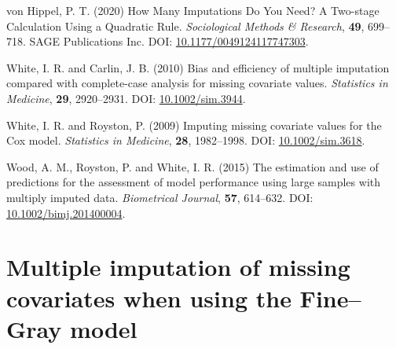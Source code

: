 \documentclass[
  letterpaper,
  DIV=11,
  numbers=noendperiod]{scrreprt}
\newlength{\cslhangindent}
\newlength{\cslentryspacingunit} %
\newenvironment{CSLReferences}[2] %
 {%
  \setlength{\parindent}{0pt}
  \ifodd #1
  \let\oldpar\par
  \def\par{\hangindent=\cslhangindent\oldpar}
  \fi
  \setlength{\parskip}{#2\cslentryspacingunit}
 }%
 {}
\begin{document}
\begin{CSLReferences}{1}{0}
\leavevmode{}%
von Hippel, P. T. (2020) How {Many Imputations Do You Need}? {A
Two-stage Calculation Using} a {Quadratic Rule}. \emph{Sociological
Methods \& Research}, \textbf{49}, 699--718. SAGE Publications Inc. DOI:
\href{https://doi.org/10.1177/0049124117747303}{10.1177/0049124117747303}.

\leavevmode{}%
White, I. R. and Carlin, J. B. (2010) Bias and efficiency of multiple
imputation compared with complete-case analysis for missing covariate
values. \emph{Statistics in Medicine}, \textbf{29}, 2920--2931. DOI:
\href{https://doi.org/10.1002/sim.3944}{10.1002/sim.3944}.

\leavevmode{}%
White, I. R. and Royston, P. (2009) Imputing missing covariate values
for the {Cox} model. \emph{Statistics in Medicine}, \textbf{28},
1982--1998. DOI:
\href{https://doi.org/10.1002/sim.3618}{10.1002/sim.3618}.

\leavevmode{}%
Wood, A. M., Royston, P. and White, I. R. (2015) The estimation and use
of predictions for the assessment of model performance using large
samples with multiply imputed data. \emph{Biometrical Journal},
\textbf{57}, 614--632. DOI:
\href{https://doi.org/10.1002/bimj.201400004}{10.1002/bimj.201400004}.

\end{CSLReferences}


\hypertarget{multiple-imputation-of-missing-covariates-when-using-the-finegray-model}{%
\chapter{Multiple imputation of missing covariates when using the
Fine--Gray
model}\label{multiple-imputation-of-missing-covariates-when-using-the-finegray-model}}
\end{document}
